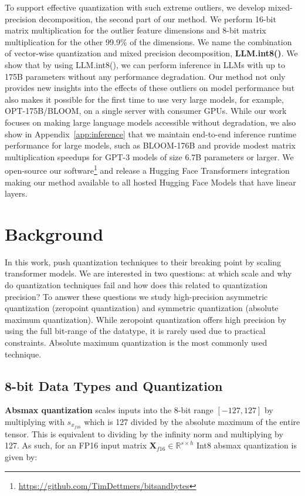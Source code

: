 To support effective quantization with such extreme outliers, we develop mixed-precision decomposition, the second part of our method. We perform 16-bit matrix multiplication for the outlier feature dimensions and 8-bit matrix multiplication for the other 99.9\% of the dimensions. We name the combination of vector-wise quantization and mixed precision decomposition, {\bf LLM.int8()}. We show that by using LLM.int8(), we can perform inference in LLMs with up to 175B parameters without any performance degradation. Our method not only provides new insights into the effects of these outliers on model performance but also makes it possible for the first time to use very large models, for example, OPT-175B/BLOOM, on a single server with consumer GPUs. While our work focuses on making large language models accessible without degradation, we also show in Appendix~\ref{app:inference} that we maintain end-to-end inference runtime performance for large models, such as BLOOM-176B and provide modest matrix multiplication speedups for GPT-3 models of size 6.7B parameters or larger. We open-source our software\footnote{\url{https://github.com/TimDettmers/bitsandbytes}} and release a Hugging Face Transformers \citep{wolf2019huggingface} integration making our method available to all hosted Hugging Face Models that have linear layers.

\section{Background}

In this work, push quantization techniques to their breaking point by scaling transformer models. We are interested in two questions: at which scale and why do quantization techniques fail and how does this related to quantization precision? To answer these questions we study high-precision asymmetric quantization (zeropoint quantization) and symmetric quantization (absolute maximum quantization). While zeropoint quantization offers high precision by using the full bit-range of the datatype, it is rarely used due to practical constraints. Absolute maximum quantization is the most commonly used technique.

\subsection{8-bit Data Types and Quantization}

\textbf{Absmax quantization} scales inputs into the 8-bit range $[-127, 127]$ by multiplying with $s_{x_{f16}}$ which is 127 divided by the absolute maximum of the entire tensor. This is equivalent to dividing by the infinity norm and multiplying by 127. As such, for an FP16 input matrix $\mathbf{X}_{f16}\in \mathbb{R}^{s\times h}$ Int8 absmax quantization is given by:

